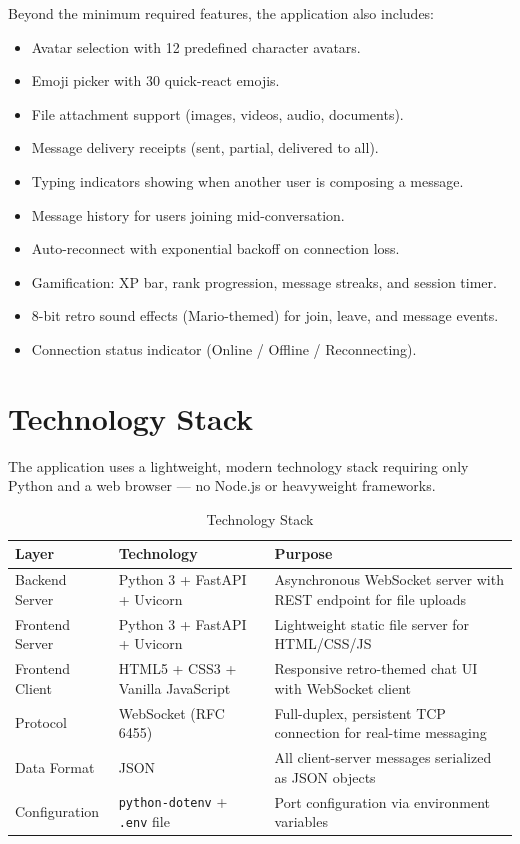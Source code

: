\documentclass[12pt, a4paper]{article}
\begin{document}
Beyond the minimum required features, the application also includes:
\begin{itemize}[leftmargin=*]
    \item Avatar selection with 12 predefined character avatars.
    \item Emoji picker with 30 quick-react emojis.
    \item File attachment support (images, videos, audio, documents).
    \item Message delivery receipts (sent, partial, delivered to all).
    \item Typing indicators showing when another user is composing a message.
    \item Message history for users joining mid-conversation.
    \item Auto-reconnect with exponential backoff on connection loss.
    \item Gamification: XP bar, rank progression, message streaks, and session timer.
    \item 8-bit retro sound effects (Mario-themed) for join, leave, and message events.
    \item Connection status indicator (Online / Offline / Reconnecting).
\end{itemize}


\section{Technology Stack}

The application uses a lightweight, modern technology stack requiring only Python and a web browser — no Node.js or heavyweight frameworks.

\begin{table}[H]
    \centering
    \caption{Technology Stack}
    \begin{tabularx}{\textwidth}{l l X}
        \toprule
        \textbf{Layer} & \textbf{Technology} & \textbf{Purpose} \\
        \midrule
        Backend Server  & Python 3 + FastAPI + Uvicorn & Asynchronous WebSocket server with REST endpoint for file uploads \\
        Frontend Server & Python 3 + FastAPI + Uvicorn & Lightweight static file server for HTML/CSS/JS \\
        Frontend Client & HTML5 + CSS3 + Vanilla JavaScript & Responsive retro-themed chat UI with WebSocket client \\
        Protocol        & WebSocket (RFC 6455) & Full-duplex, persistent TCP connection for real-time messaging \\
        Data Format     & JSON & All client-server messages serialized as JSON objects \\
        Configuration   & \texttt{python-dotenv} + \texttt{.env} file & Port configuration via environment variables \\
        \bottomrule
    \end{tabularx}
\end{table}
\end{document}
